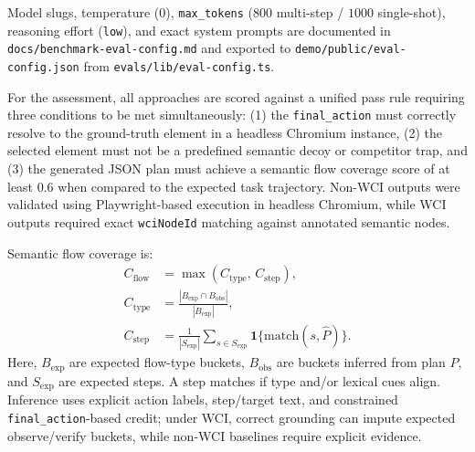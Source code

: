 \noindent Model slugs, temperature ($0$), \texttt{max\_tokens} ($800$ multi-step / $1000$ single-shot), reasoning effort (\texttt{low}), and exact system prompts are documented in \texttt{docs/benchmark-eval-config.md} and exported to \texttt{demo/public/eval-config.json} from \texttt{evals/lib/eval-config.ts}.
\par\noindent For the assessment, all approaches are scored against a unified pass rule requiring three conditions to be met simultaneously: (1) the \texttt{final\_action} must correctly resolve to the ground-truth element in a headless Chromium instance, (2) the selected element must not be a predefined semantic decoy or competitor trap, and (3) the generated JSON plan must achieve a semantic flow coverage score of at least 0.6 when compared to the expected task trajectory. Non-WCI outputs were validated using Playwright-based execution in headless Chromium, while WCI outputs required exact \texttt{wciNodeId} matching against annotated semantic nodes.
\par\noindent Semantic flow coverage is:
\[
\begin{aligned}
C_{\mathrm{flow}}&=\max\!\left(C_{\mathrm{type}},\,C_{\mathrm{step}}\right),\\
C_{\mathrm{type}}&=\frac{|B_{\mathrm{exp}}\cap B_{\mathrm{obs}}|}{|B_{\mathrm{exp}}|},\\
C_{\mathrm{step}}&=\frac{1}{|S_{\mathrm{exp}}|}
\sum_{s\in S_{\mathrm{exp}}}\mathbf{1}\{\mathrm{match}(s,\hat{P})\}.
\end{aligned}
\]
Here, \(B_{\mathrm{exp}}\) are expected flow-type buckets, \(B_{\mathrm{obs}}\) are buckets inferred from plan \(\hat{P}\), and \(S_{\mathrm{exp}}\) are expected steps. A step matches if type and/or lexical cues align. Inference uses explicit action labels, step/target text, and constrained \texttt{final\_action}-based credit; under WCI, correct grounding can impute expected observe/verify buckets, while non-WCI baselines require explicit evidence.
